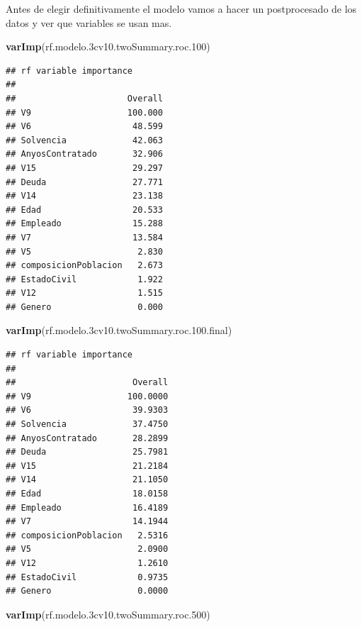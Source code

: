 \documentclass[
]{article}
\newenvironment{Shaded}{\begin{snugshade}}{\end{snugshade}}
\newcommand{\FloatTok}[1]{\textcolor[rgb]{0.00,0.00,0.81}{#1}}
\newcommand{\FunctionTok}[1]{\textcolor[rgb]{0.13,0.29,0.53}{\textbf{#1}}}
\newcommand{\NormalTok}[1]{#1}
\begin{document}
Antes de elegir definitivamente el modelo vamos a hacer un postprocesado
de los datos y ver que variables se usan mas.

\begin{Shaded}
\begin{Highlighting}[]
\FunctionTok{varImp}\NormalTok{(rf.modelo}\FloatTok{.3}\NormalTok{cv10.twoSummary.roc}\FloatTok{.100}\NormalTok{)}
\end{Highlighting}
\end{Shaded}

\begin{verbatim}
## rf variable importance
## 
##                      Overall
## V9                   100.000
## V6                    48.599
## Solvencia             42.063
## AnyosContratado       32.906
## V15                   29.297
## Deuda                 27.771
## V14                   23.138
## Edad                  20.533
## Empleado              15.288
## V7                    13.584
## V5                     2.830
## composicionPoblacion   2.673
## EstadoCivil            1.922
## V12                    1.515
## Genero                 0.000
\end{verbatim}

\begin{Shaded}
\begin{Highlighting}[]
\FunctionTok{varImp}\NormalTok{(rf.modelo}\FloatTok{.3}\NormalTok{cv10.twoSummary.roc.}\FloatTok{100.}\NormalTok{final)}
\end{Highlighting}
\end{Shaded}

\begin{verbatim}
## rf variable importance
## 
##                       Overall
## V9                   100.0000
## V6                    39.9303
## Solvencia             37.4750
## AnyosContratado       28.2899
## Deuda                 25.7981
## V15                   21.2184
## V14                   21.1050
## Edad                  18.0158
## Empleado              16.4189
## V7                    14.1944
## composicionPoblacion   2.5316
## V5                     2.0900
## V12                    1.2610
## EstadoCivil            0.9735
## Genero                 0.0000
\end{verbatim}

\begin{Shaded}
\begin{Highlighting}[]
\FunctionTok{varImp}\NormalTok{(rf.modelo}\FloatTok{.3}\NormalTok{cv10.twoSummary.roc}\FloatTok{.500}\NormalTok{)}
\end{Highlighting}
\end{Shaded}
\end{document}
